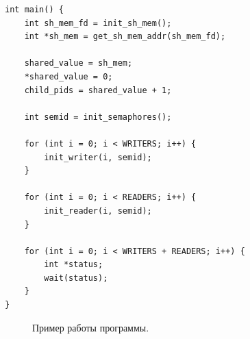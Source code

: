 \documentclass[12pt]{report}
\begin{document}
\begin{lstlisting}[label=two,caption = Задача читатели-писатели, style = CStyle]
int main() {
	int sh_mem_fd = init_sh_mem();
	int *sh_mem = get_sh_mem_addr(sh_mem_fd);
	
	shared_value = sh_mem;
	*shared_value = 0;
	child_pids = shared_value + 1;
	
	int semid = init_semaphores();
	
	for (int i = 0; i < WRITERS; i++) {
		init_writer(i, semid);
	}
	
	for (int i = 0; i < READERS; i++) {
		init_reader(i, semid);
	}
	
	for (int i = 0; i < WRITERS + READERS; i++) {
		int *status;
		wait(status);
	}
}
\end{lstlisting}

\begin{figure}[H]
	\caption{Пример работы программы.}
	\label{ris:5}
\end{figure}
\end{document}
